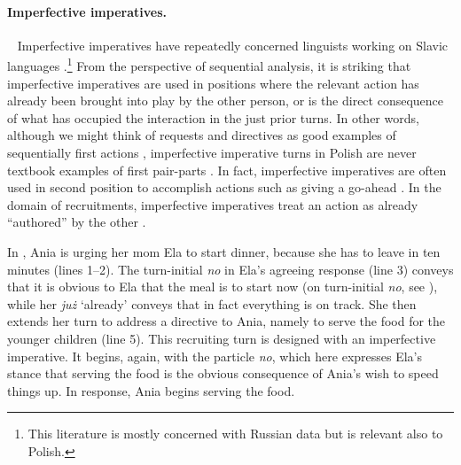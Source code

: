 \documentclass[output=paper]{langsci/langscibook}
\begin{document}
\paragraph{Imperfective imperatives.}\label{sec:zinken:3.3.1.2.} ~ Imperfective imperatives have repeatedly \mbox{concerned} linguists working on Slavic languages \citep[see][]{Forsyth1970,Lehmann1989,benacchio2010}.\footnote{This literature is mostly concerned with Russian data but is relevant also to Polish.} From the perspective of sequential analysis, it is striking that imperfective imperatives are used in positions where the relevant action has already been brought into play by the other person, or is the direct consequence of what has occupied the interaction in the just prior turns.  In other words, although we might think of requests and directives as good examples of sequentially first actions \citep{SorjonenRaevaaraCouperKuhlen2017}, imperfective imperative turns in Polish are never textbook examples of first pair-parts \citep{Schegloff2007}. In fact, imperfective imperatives are often used in second position to accomplish actions such as giving a go-ahead \citep{Lehmann1989,ZinkenDeppermann2017}.  In the domain of recruitments, imperfective imperatives treat an action as already ``authored'' by the other \citep[chap. 8]{Zinken2016}.

In , Ania is urging her mom Ela to start dinner, because she has to leave in ten minutes (lines 1--2).  The turn-initial \textit{no} in Ela’s agreeing response (line 3) conveys that it is obvious to Ela that the meal is to start now (on turn-initial \textit{no}, see \citealt{Weidner2013b}), while her \textit{już} `already' conveys that in fact everything is on track. She then extends her turn to address a directive to Ania, namely to serve the food for the younger children (line 5).  This recruiting turn is designed with an imperfective imperative.  It begins, again, with the particle \textit{no}, which here expresses Ela’s stance that serving the food is the obvious consequence of Ania’s wish to speed things up.  In response, Ania begins serving the food.
\end{document}
